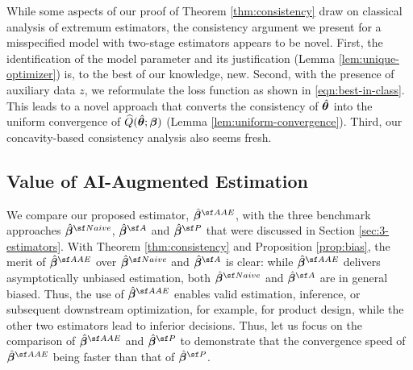 While some aspects of our proof of Theorem \ref{thm:consistency} draw on classical analysis of extremum estimators, the consistency argument we present for a misspecified model with two-stage estimators appears to be novel.
First, the identification of the model parameter and its justification (Lemma \ref{lem:unique-optimizer}) is, to the best of our knowledge, new. 
Second, with the presence of auxiliary data $z$, we reformulate the loss function as shown in \eqref{eqn:best-in-class}. This leads to a novel approach that converts the consistency of $\hat{\bm{\theta}}$ into the uniform convergence of $\widehat{Q}(\hat{\bm{\theta}}; \bm{\beta})$ (Lemma \ref{lem:uniform-convergence}). 
Third, our concavity-based consistency analysis also seems fresh.

\subsection{Value of AI-Augmented Estimation}
\label{sec:AAE}
We compare our proposed estimator, $\hat{\betavec}^{\sf AAE}$, with the three benchmark approaches $\hat{\betavec}^{\sf Naive}$, $\hat{\betavec}^{\sf A}$ and $\hat{\betavec}^{\sf P}$ that were discussed in Section \ref{sec:3-estimators}. 
With Theorem \ref{thm:consistency} and Proposition \ref{prop:bias}, the merit of $\hat{\betavec}^{\sf AAE}$ over $\hat{\betavec}^{\sf Naive}$ and $\hat{\betavec}^{\sf A}$ is clear: while $\hat{\betavec}^{\sf AAE}$ delivers asymptotically unbiased estimation, both $\hat{\betavec}^{\sf Naive}$ and $\hat{\betavec}^{\sf A}$ are in general biased. 
Thus, the use of $\hat{\betavec}^{\sf AAE}$  enables valid estimation, inference, or
subsequent downstream optimization, for example, for product design, while the other two estimators lead to inferior decisions. 
Thus, let us focus on the comparison of $\hat{\betavec}^{\sf AAE}$ and $\hat{\betavec}^{\sf P}$ to demonstrate that the convergence speed of $\hat{\betavec}^{\sf AAE}$ being faster than that of $\hat{\betavec}^{\sf P}$. 

